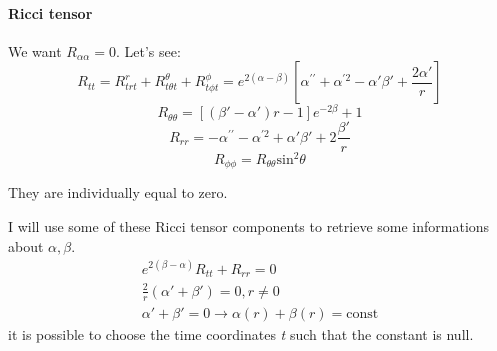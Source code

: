 \paragraph{Ricci tensor}
We want $R_{\alpha \alpha } = 0$. Let's see:
\begin{equation}
	R_{tt} = R^{r}_{trt} + R^{\theta }_{t\theta t} + R^{\phi }_{t\phi t} = e^{2\left( \alpha -\beta  \right)}\left[ \alpha^{\prime \prime } + \alpha ^{\prime 2} - \alpha '\beta ' +\frac{2\alpha '}{r}\right] 
\end{equation}
\begin{equation}
	R_{\theta \theta } = \left[ \left( \beta ' - \alpha '  \right)r-1\right] e^{-2\beta }+1
\end{equation}
\begin{equation}
R_{rr} = -\alpha^{\prime \prime } - \alpha ^{\prime 2} + \alpha ' \beta ' + 2 \frac{\beta '}{r}
\end{equation}
\begin{equation}
	R_{\phi \phi } = R_{\theta \theta }\text{sin}^{2}\theta 
\end{equation}

They are individually equal to zero.

I will use some of these Ricci tensor components to retrieve some informations about $\alpha, \beta $.
\begin{gather*}
e^{2\left( \beta -\alpha  \right)}R_{tt} + R_{rr} = 0 \\
\frac{2}{r}\left( \alpha '+\beta ' \right) = 0 , r\neq 0 \\
\alpha '+ \beta ' = 0 \to  \alpha \left( r \right)+\beta \left( r \right) = \text{const}
\end{gather*}
it is possible to choose the time coordinates \emph{t} such that the constant is null.

